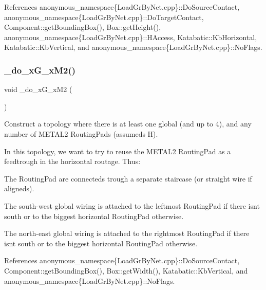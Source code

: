  

References anonymous\+\_\+namespace\{\+Load\+Gr\+By\+Net.\+cpp\}\+::\+Do\+Source\+Contact, anonymous\+\_\+namespace\{\+Load\+Gr\+By\+Net.\+cpp\}\+::\+Do\+Target\+Contact, Component\+::get\+Bounding\+Box(), Box\+::get\+Height(), anonymous\+\_\+namespace\{\+Load\+Gr\+By\+Net.\+cpp\}\+::\+H\+Access, Katabatic\+::\+Kb\+Horizontal, Katabatic\+::\+Kb\+Vertical, and anonymous\+\_\+namespace\{\+Load\+Gr\+By\+Net.\+cpp\}\+::\+No\+Flags.

\mbox{\label{group__LoadGlobalRouting_ga532d1c6b530e0375078ea2d6ea3c6024}} 
\subsubsection{\texorpdfstring{\+\_\+do\+\_\+x\+G\+\_\+x\+M2()}{\_do\_xG\_xM2()}}
{\footnotesize\ttfamily void \+\_\+do\+\_\+x\+G\+\_\+x\+M2 (\begin{DoxyParamCaption}{ }\end{DoxyParamCaption})\hspace{0.3cm}{\ttfamily [private]}}

Construct a topology where there is at least one global (and up to 4), and any number of {\ttfamily M\+E\+T\+A\+L2} Routing\+Pads (assumeds H).

In this topology, we want to try to reuse the {\ttfamily M\+E\+T\+A\+L2} Routing\+Pad as a feedtrough in the horizontal routage. Thus\+:
\begin{DoxyItemize}
\item The Routing\+Pad are connecteds trough a separate staircase (or straight wire if aligneds).
\item The south-\/west global wiring is attached to the leftmost Routing\+Pad if there isn\textquotesingle{}t south or to the biggest horizontal Routing\+Pad otherwise.
\item The north-\/east global wiring is attached to the rightmost Routing\+Pad if there isn\textquotesingle{}t south or to the biggest horizontal Routing\+Pad otherwise.
\end{DoxyItemize}

 

References anonymous\+\_\+namespace\{\+Load\+Gr\+By\+Net.\+cpp\}\+::\+Do\+Source\+Contact, Component\+::get\+Bounding\+Box(), Box\+::get\+Width(), Katabatic\+::\+Kb\+Vertical, and anonymous\+\_\+namespace\{\+Load\+Gr\+By\+Net.\+cpp\}\+::\+No\+Flags.

